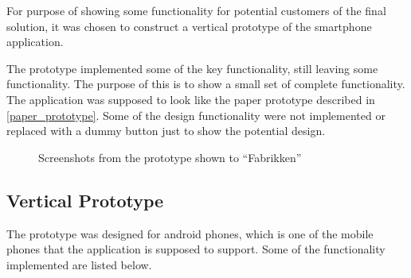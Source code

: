 For purpose of showing some functionality for potential customers of the final solution, it was chosen to construct a vertical prototype of the smartphone application.

The prototype implemented some of the key functionality, still leaving some functionality. The purpose of this is to show a small set of complete functionality. The application was supposed to look like the paper prototype described in \cref{paper_prototype}. Some of the design functionality were not implemented or replaced with a dummy button just to show the potential design.

\begin{figure}[h!]
  \centering
  \caption{Screenshots from the prototype shown to \enquote{Fabrikken}}
\end{figure}

\subsection{Vertical Prototype}
\label{sub:vertical_prototype}
The prototype was designed for android phones, which is one of the mobile phones that the application is supposed to support. Some of the functionality implemented are listed below. 


